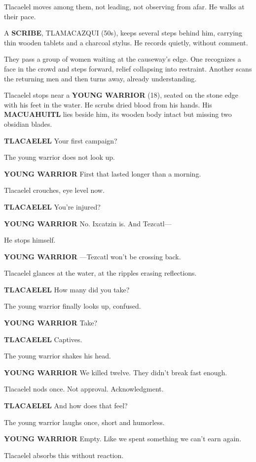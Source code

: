 \documentclass[12pt]{article}
\begin{document}
Tlacaelel moves among them, not leading, not observing from afar. He walks at their pace.

A \textbf{SCRIBE}, TLAMACAZQUI (50s), keeps several steps behind him, carrying thin wooden tablets and a charcoal stylus. He records quietly, without comment.

They pass a group of women waiting at the causeway’s edge. One recognizes a face in the crowd and steps forward, relief collapsing into restraint. Another scans the returning men and then turns away, already understanding.

Tlacaelel stops near a \textbf{YOUNG WARRIOR} (18), seated on the stone edge with his feet in the water. He scrubs dried blood from his hands. His \textbf{MACUAHUITL} lies beside him, its wooden body intact but missing two obsidian blades.

\textbf{TLACAELEL}  
Your first campaign?

The young warrior does not look up.

\textbf{YOUNG WARRIOR}  
First that lasted longer than a morning.

Tlacaelel crouches, eye level now.

\textbf{TLACAELEL}  
You’re injured?

\textbf{YOUNG WARRIOR}  
No.  
Ixcatzin is. And Tezcatl—

He stops himself.

\textbf{YOUNG WARRIOR}  
—Tezcatl won’t be crossing back.

Tlacaelel glances at the water, at the ripples erasing reflections.

\textbf{TLACAELEL}  
How many did you take?

The young warrior finally looks up, confused.

\textbf{YOUNG WARRIOR}  
Take?

\textbf{TLACAELEL}  
Captives.

The young warrior shakes his head.

\textbf{YOUNG WARRIOR}  
We killed twelve.  
They didn’t break fast enough.

Tlacaelel nods once. Not approval. Acknowledgment.

\textbf{TLACAELEL}  
And how does that feel?

The young warrior laughs once, short and humorless.

\textbf{YOUNG WARRIOR}  
Empty.  
Like we spent something we can’t earn again.

Tlacaelel absorbs this without reaction.
\end{document}
